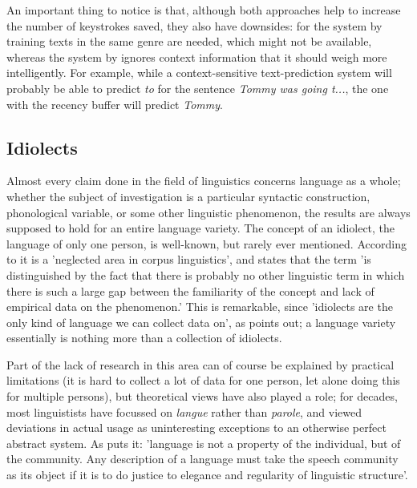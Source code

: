 \documentclass[12pt]{article}
\begin{document}
An important thing to notice is that, although both approaches help to increase the number of keystrokes saved, they also have downsides: for the system by  training texts in the same genre are needed, which might not be available, whereas the system by  ignores context information that it should weigh more intelligently. For example, while a context-sensitive text-prediction system will probably be able to predict \emph{to} for the sentence \emph{Tommy was going t...}, the one with the recency buffer will predict \emph{Tommy}.


\subsection{Idiolects} \label{idiolects}
Almost every claim done in the field of linguistics concerns language as a whole; whether the subject of investigation is a particular syntactic construction, phonological variable, or some other linguistic phenomenon, the results are always supposed to hold for an entire language variety. The concept of an idiolect, the language of only one person, is well-known, but rarely ever mentioned. According to  it is a 'neglected area in corpus linguistics', and  states that the term 'is distinguished by the fact that there is probably no other linguistic term in which there is such a large gap between the familiarity of the concept and lack of empirical data on the phenomenon.' This is remarkable, since 'idiolects are the only kind of language we can 
collect data on', as  points out; a language variety essentially is nothing more than a collection of idiolects.

Part of the lack of research in this area can of course be explained by practical limitations (it is hard to collect a lot of data for one person, let alone doing this for multiple persons), but theoretical views have also played a role; for decades, most linguistists have focussed on \emph{langue} rather than \emph{parole}, and viewed deviations in actual usage as uninteresting exceptions to an otherwise perfect abstract system. As  puts it: 'language is not a property of the individual, but of the community. Any description of a language must take the speech community as its object if it is to do justice to elegance and regularity of linguistic structure'.
\end{document}
